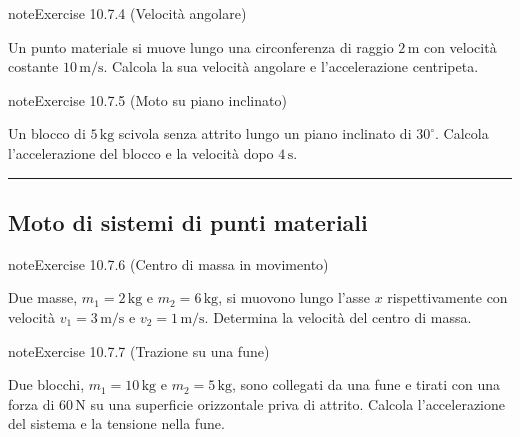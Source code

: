 \documentclass[letterpaper,10pt,italian]{jupyterBook}
\begin{document}
\begin{sphinxadmonition}{note}{Exercise 10.7.4 (Velocità angolare)}



\sphinxAtStartPar
Un punto materiale si muove lungo una circonferenza di raggio \(2 \, \text{m}\) con velocità costante \(10 \, \text{m/s}\). Calcola la sua velocità angolare e l’accelerazione centripeta.
\end{sphinxadmonition}
 \label{exercise:ch/mechanics/dynamics-problems-exercise-4}

\begin{sphinxadmonition}{note}{Exercise 10.7.5 (Moto su piano inclinato)}



\sphinxAtStartPar
Un blocco di \(5 \, \text{kg}\) scivola senza attrito lungo un piano inclinato di \(30^\circ\). Calcola l’accelerazione del blocco e la velocità dopo \(4 \, \text{s}\).
\end{sphinxadmonition}


\bigskip\hrule\bigskip



\subsection{Moto di sistemi di punti materiali}
\label{\detokenize{ch/mechanics/dynamics-problems:moto-di-sistemi-di-punti-materiali}} \label{exercise:ch/mechanics/dynamics-problems-exercise-5}

\begin{sphinxadmonition}{note}{Exercise 10.7.6 (Centro di massa in movimento)}



\sphinxAtStartPar
Due masse, \(m_1 = 2 \, \text{kg}\) e \(m_2 = 6 \, \text{kg}\), si muovono lungo l’asse \(x\) rispettivamente con velocità \(v_1 = 3 \, \text{m/s}\) e \(v_2 = 1 \, \text{m/s}\). Determina la velocità del centro di massa.
\end{sphinxadmonition}
 \label{exercise:ch/mechanics/dynamics-problems-exercise-6}

\begin{sphinxadmonition}{note}{Exercise 10.7.7 (Trazione su una fune)}



\sphinxAtStartPar
Due blocchi, \(m_1 = 10 \, \text{kg}\) e \(m_2 = 5 \, \text{kg}\), sono collegati da una fune e tirati con una forza di \(60 \, \text{N}\) su una superficie orizzontale priva di attrito. Calcola l’accelerazione del sistema e la tensione nella fune.
\end{sphinxadmonition}
 \label{exercise:ch/mechanics/dynamics-problems-exercise-7}
\end{document}
